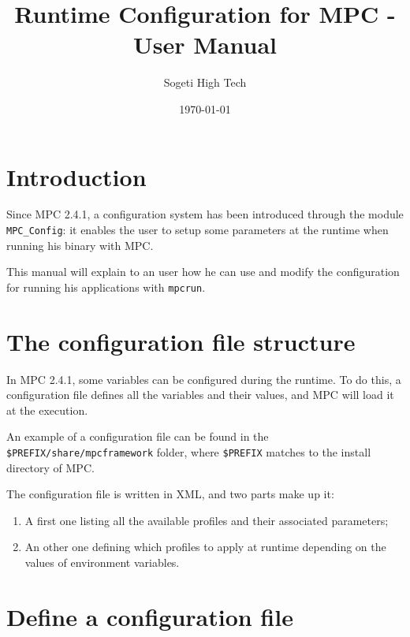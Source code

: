 \documentclass{article}
\author{Sogeti High Tech}
\title{Runtime Configuration for MPC - User Manual}
\date{\today}
\begin{document}
\hypersetup{pageanchor=false,citecolor=blue}
\maketitle

\newpage
{}
\tableofcontents
\newpage
{}
\hypersetup{pageanchor=true,citecolor=blue}

\section{Introduction}

Since MPC 2.4.1, a configuration system has been introduced through the module \texttt{MPC\_Config}: it enables the user to setup some parameters at the runtime when running his binary with MPC.
\newline

\noindent This manual will explain to an user how he can use and modify the configuration for running his applications with \texttt{mpcrun}.

\section {The configuration file structure}

In MPC 2.4.1, some variables can be configured during the runtime. To do this, a configuration file defines all the variables and their values, and MPC will load it at the execution.
\newline

\noindent An example of a configuration file can be found in the \texttt{\$PREFIX/share/mpcframework} folder, where \texttt{\$PREFIX} matches to the install directory of MPC.
\newline

\noindent The configuration file is written in XML, and two parts make up it:
\begin{enumerate}
\item A first one listing all the available profiles and their associated parameters;
\item An other one defining which profiles to apply at runtime depending on the values of environment variables.
\end{enumerate}

\section{Define a configuration file}
\end{document}
